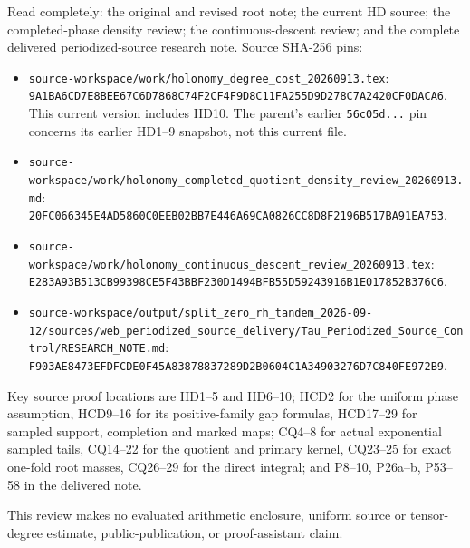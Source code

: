 Read completely: the original and revised root note; the current HD source; the completed-phase density review; the continuous-descent review; and the complete delivered periodized-source research note. Source SHA-256 pins:

\begin{itemize}
\tightlist
\item
  \texttt{source-workspace/work/holonomy\_degree\_cost\_20260913.tex}: \texttt{9A1BA6CD7E8BEE67C6D7868C74F2CF4F9D8C11FA255D9D278C7A2420CF0DACA6}. This current version includes HD10. The parent's earlier \texttt{56c05d...} pin concerns its earlier HD1--9 snapshot, not this current file.
\item
  \texttt{source-workspace/work/holonomy\_completed\_quotient\_density\_review\_20260913.md}: \texttt{20FC066345E4AD5860C0EEB02BB7E446A69CA0826CC8D8F2196B517BA91EA753}.
\item
  \texttt{source-workspace/work/holonomy\_continuous\_descent\_review\_20260913.tex}: \texttt{E283A93B513CB99398CE5F43BBF230D1494BFB55D59243916B1E017852B376C6}.
\item
  \texttt{source-workspace/output/split\_zero\_rh\_tandem\_2026-09-12/sources/web\_periodized\_source\_delivery/Tau\_Periodized\_Source\_Control/RESEARCH\_NOTE.md}: \texttt{F903AE8473EFDFCDE0F45A83878837289D2B0604C1A34903276D7C840FE972B9}.
\end{itemize}

Key source proof locations are HD1--5 and HD6--10; HCD2 for the uniform phase assumption, HCD9--16 for its positive-family gap formulas, HCD17--29 for sampled support, completion and marked maps; CQ4--8 for actual exponential sampled tails, CQ14--22 for the quotient and primary kernel, CQ23--25 for exact one-fold root masses, CQ26--29 for the direct integral; and P8--10, P26a--b, P53--58 in the delivered note.

This review makes no evaluated arithmetic enclosure, uniform source or tensor-degree estimate, public-publication, or proof-assistant claim.
